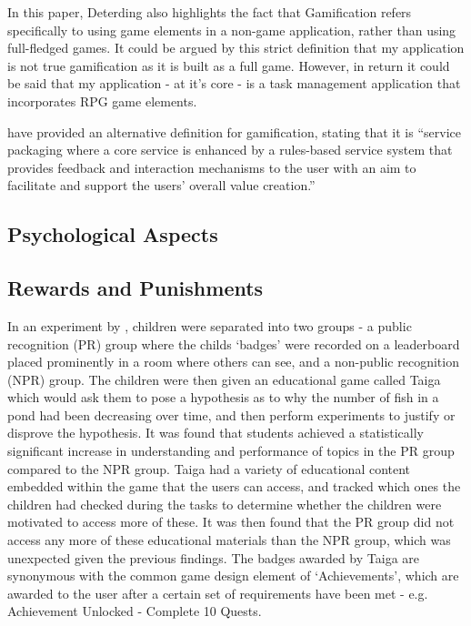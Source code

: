 In this paper, Deterding also highlights the fact that Gamification refers specifically to using game elements in a non-game application, rather than using full-fledged games.
It could be argued by this strict definition that my application is not true gamification as it is built as a full game.
However, in return it could be said that my application - at it's core - is a task management application that incorporates RPG game elements.

\cite{huotari2011gamification} have provided an alternative definition for gamification, stating that it is ``service packaging where a core service is enhanced by a rules-based service system that provides feedback and interaction mechanisms to the user with an aim to facilitate and support the users’ overall value creation.''

\subsection{Psychological Aspects}

\subsection{Rewards and Punishments}
In an experiment by \cite{Filsecker2014136}, children were separated into two groups - a public recognition (PR) group where the childs `badges' were recorded on a leaderboard placed prominently in a room where others can see, and a non-public recognition (NPR) group.
The children were then given an educational game called Taiga which would ask them to pose a hypothesis as to why the number of fish in a pond had been decreasing over time, and then perform experiments to justify or disprove the hypothesis.
It was found that students achieved a statistically significant increase in understanding and performance of topics in the PR group compared to the NPR group.
Taiga had a variety of educational content embedded within the game that the users can access, and tracked which ones the children had checked during the tasks to determine whether the children were motivated to access more of these. 
It was then found that the PR group did not access any more of these educational materials than the NPR group, which was unexpected given the previous findings. 
The badges awarded by Taiga are synonymous with the common game design element of `Achievements', which are awarded to the user after a certain set of requirements have been met - e.g. Achievement Unlocked - Complete 10 Quests.

